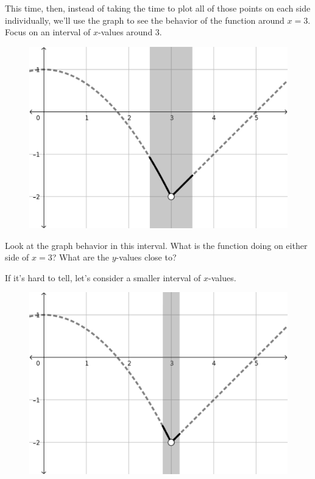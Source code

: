 This time, then, instead of taking the time to plot all of those points on each side individually, we'll use the graph to see the behavior of the function around $x=3$.
Focus on an interval of $x$-values around $3$.

\begin{figure}[h!tb]
  \includegraphics[scale=0.75]{./1_limits/images/1-1_graph1bar1.png}
  \centering
\end{figure}

Look at the graph behavior in this interval.
What is the function doing on either side of $x=3$?
What are the $y$-values close to?

If it's hard to tell, let's consider a smaller interval of $x$-values.

\begin{figure}[h!tb]
  \includegraphics[scale=0.75]{./1_limits/images/1-1_graph1bar2.png}
  \centering
\end{figure}

